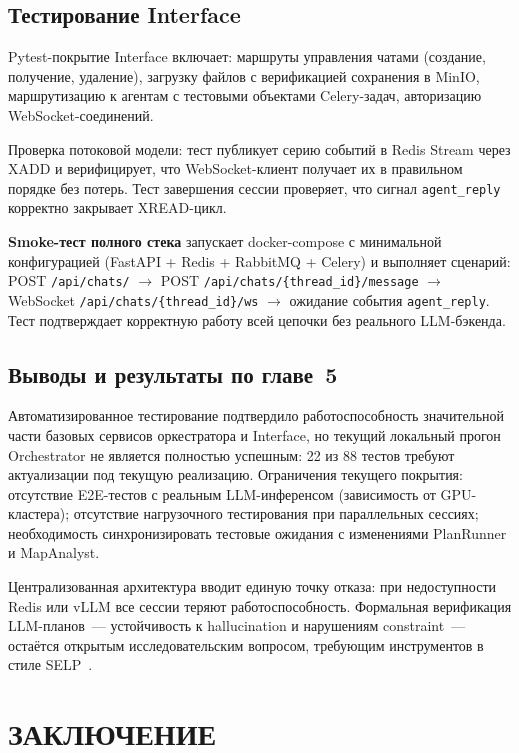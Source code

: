 \documentclass[14pt,a4paper]{extreport}
\begin{document}
\section{Тестирование Interface}

Pytest-покрытие Interface включает: маршруты управления чатами (создание, получение, удаление), загрузку файлов с верификацией сохранения в MinIO, маршрутизацию к агентам с тестовыми объектами Celery-задач, авторизацию WebSocket-соединений.

Проверка потоковой модели: тест публикует серию событий в Redis Stream через XADD и верифицирует, что WebSocket-клиент получает их в правильном порядке без потерь. Тест завершения сессии проверяет, что сигнал \texttt{agent\_reply} корректно закрывает XREAD-цикл.

\textbf{Smoke-тест полного стека} запускает docker-compose с минимальной конфигурацией (FastAPI + Redis + RabbitMQ + Celery) и выполняет сценарий: POST \texttt{/api/chats/} $\to$ POST \texttt{/api/chats/\{thread\_id\}/message} $\to$ WebSocket \texttt{/api/chats/\{thread\_id\}/ws} $\to$ ожидание события \texttt{agent\_reply}. Тест подтверждает корректную работу всей цепочки без реального LLM-бэкенда.

\section{Выводы и результаты по главе~5}

Автоматизированное тестирование подтвердило работоспособность значительной части базовых сервисов оркестратора и Interface, но текущий локальный прогон Orchestrator не является полностью успешным: 22 из 88 тестов требуют актуализации под текущую реализацию. Ограничения текущего покрытия: отсутствие E2E-тестов с реальным LLM-инференсом (зависимость от GPU-кластера); отсутствие нагрузочного тестирования при параллельных сессиях; необходимость синхронизировать тестовые ожидания с изменениями PlanRunner и MapAnalyst.

Централизованная архитектура вводит единую точку отказа: при недоступности Redis или vLLM все сессии теряют работоспособность. Формальная верификация LLM-планов~--- устойчивость к hallucination и нарушениям constraint~--- остаётся открытым исследовательским вопросом, требующим инструментов в стиле SELP~\cite{pan2025selp}.

\chapter*{ЗАКЛЮЧЕНИЕ}
\end{document}

